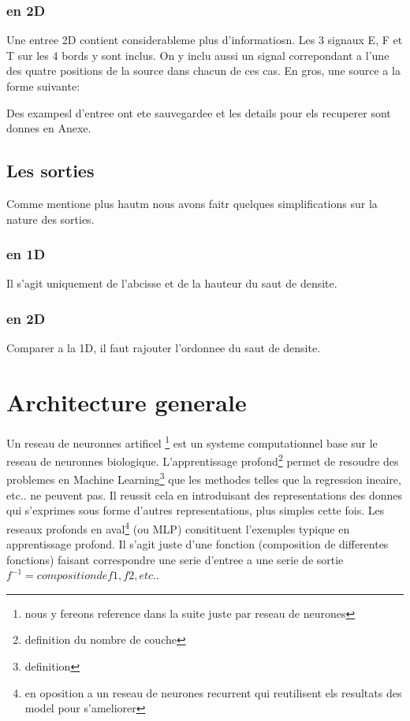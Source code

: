 \subsubsection{en 2D}
Une entree 2D contient considerableme plus d'informatiosn. Les 3 signaux E, F et T sur les 4 bords y sont inclus. On y inclu aussi un signal correpondant a l'une des quatre positions de la source dans chacun de ces cas. En gros, une source a la forme suivante:

Des exampesl d'entree ont ete sauvegardee et les details pour els recuperer sont donnes en Anexe.

\subsection{Les sorties}
Comme mentione plus hautm nous avons faitr quelques simplifications sur la nature des sorties.
\subsubsection{en 1D}
Il s'agit uniquement de l'abcisse et de la hauteur du saut de densite.
\subsubsection{en 2D}
Comparer a la 1D, il faut rajouter l'ordonnee du saut de densite.


\section{Architecture generale}

Un reseau de neuronnes artificel \footnote{nous y fereons reference dans la suite juste par reseau de neurones} est un systeme computationnel base sur le reseau de neuronnes biologique. L'apprentissage profond\footnote{definition du nombre de couche} permet de resoudre des problemes en Machine Learning\footnote{definition} que les methodes telles que la regression ineaire, etc.. ne peuvent pas. Il reussit cela en introduisant des representations des donnes qui s'exprimes sous forme d'autres representations, plus simples cette fois. Les reseaux profonds en aval\footnote{en oposition a un reseau de neurones recurrent qui reutilisent els resultats des model pour s'ameliorer} (ou MLP) consitituent l'exemples typique en apprentissage profond. Il s'agit juste d'une fonction (composition de differentes fonctions) faisant correspondre une serie d'entree a une serie de sortie $f^{-1} = composition de f1, f2, etc.$.

